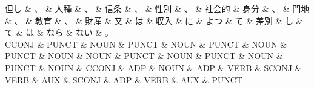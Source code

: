 \documentclass[tikz,border=5pt]{standalone}
\begin{document}
\normalsize
\begin{dependency}[edge unit distance=11.4pt]
    \begin{deptext}[column sep=1em]
        但し \& 、 \& 人種 \& 、 \& 信条 \& 、 \& 性別 \& 、 \& 社会的 \& 身分 \& 、 \& 門地 \& 、 \& 教育 \& 、 \& 財産 \& 又 \& は \& 収入 \& に \& よつ \& て \& 差別 \& し \& て \& は \& なら \& ない \& 。\\
        CCONJ \& PUNCT \& NOUN \& PUNCT \& NOUN \& PUNCT \& NOUN \& PUNCT \& NOUN \& NOUN \& PUNCT \& NOUN \& PUNCT \& NOUN \& PUNCT \& NOUN \& CCONJ \& ADP \& NOUN \& ADP \& VERB \& SCONJ \& VERB \& AUX \& SCONJ \& ADP \& VERB \& AUX \& PUNCT\\
    \end{deptext}
\end{dependency}
\end{document}

